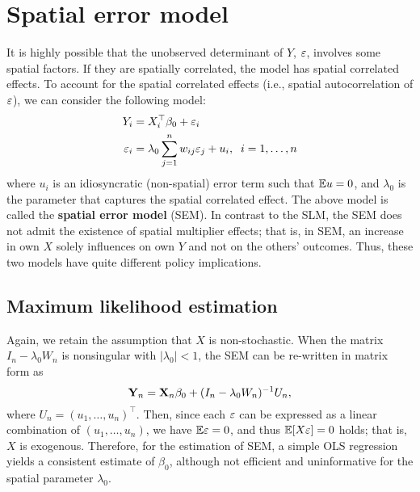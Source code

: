 \documentclass[11pt, A4paper, openany, uplatex]{book}
\begin{document}
\section{Spatial error model}\label{sec:SEM}

It is highly possible that the unobserved determinant of $Y$, $\varepsilon$, involves some spatial factors.
If they are spatially correlated, the model has spatial correlated effects.
To account for the spatial correlated effects (i.e., spatial autocorrelation of $\varepsilon$), we can consider the following model:
\begin{align}\label{eq:sem}
\begin{split}
	Y_i  & = X_i^\top\beta_0 + \varepsilon_i \\
	\varepsilon_i & = \lambda_0 \sum_{j = 1}^n w_{ij} \varepsilon_j + u_i, \;\; i = 1,\ldots,n
\end{split}
\end{align}
where $u_i$ is an idiosyncratic (non-spatial) error term such that $\mathbb{E} u = 0$, and $\lambda_0$ is the parameter that captures the spatial correlated effect.
The above model is called the \textbf{spatial error model} (SEM).
In contrast to the SLM, the SEM does not admit the existence of spatial multiplier effects; that is, in SEM, an increase in own $X$ solely influences on own $Y$ and not on the others' outcomes.
Thus, these two models have quite different policy implications.

\subsection{Maximum likelihood estimation}
Again, we retain the assumption that $X$ is non-stochastic.
When the matrix $I_n - \lambda_0 W_n$  is nonsingular with $|\lambda_0| < 1$, the SEM can be re-written in matrix form as
\[
	\mathbf{Y}_n =  \mathbf{X}_n \beta_0 + (I_n - \lambda_0 W_n)^{-1}U_n,
\]
where $U_n = (u_1, \ldots, u_n)^\top$.
Then, since each $\varepsilon$ can be expressed as a linear combination of $(u_1, \ldots, u_n)$, we have $\mathbb{E} \varepsilon = 0$, and thus $\mathbb{E}[X \varepsilon] = 0$ holds; that is, $X$ is exogenous.
Therefore, for the estimation of SEM, a simple OLS regression yields a consistent estimate of $\beta_0$, although not efficient and uninformative for the spatial parameter $\lambda_0$.
\end{document}

